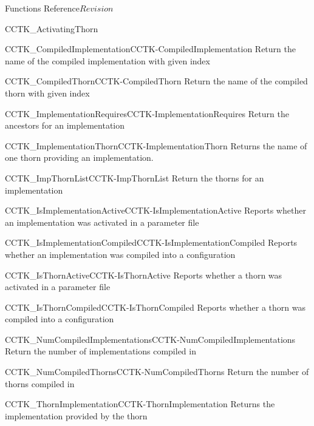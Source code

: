 \begin{cactuspart}{ Functions Reference}{}{$Revision$}
\begin{FunctionDescription}{CCTK\_ActivatingThorn}
\begin{SeeAlsoSection}
\begin{SeeAlso2}{CCTK\_CompiledImplementation}{CCTK-CompiledImplementation}
  Return the name of the compiled implementation with given index
\end{SeeAlso2}
\begin{SeeAlso2}{CCTK\_CompiledThorn}{CCTK-CompiledThorn}
  Return the name of the compiled thorn with given index
\end{SeeAlso2}
\begin{SeeAlso2}{CCTK\_ImplementationRequires}{CCTK-ImplementationRequires}
  Return the ancestors for an implementation
\end{SeeAlso2}
\begin{SeeAlso2}{CCTK\_ImplementationThorn}{CCTK-ImplementationThorn}
  Returns the name of one thorn providing an implementation.
\end{SeeAlso2}
\begin{SeeAlso2}{CCTK\_ImpThornList}{CCTK-ImpThornList}
  Return the thorns for an implementation
\end{SeeAlso2}
\begin{SeeAlso2}{CCTK\_IsImplementationActive}{CCTK-IsImplementationActive}
  Reports whether an implementation was activated in a parameter file
\end{SeeAlso2}
\begin{SeeAlso2}{CCTK\_IsImplementationCompiled}{CCTK-IsImplementationCompiled}
  Reports whether an implementation was compiled into a configuration
\end{SeeAlso2}
\begin{SeeAlso2}{CCTK\_IsThornActive}{CCTK-IsThornActive}
  Reports whether a thorn was activated in a parameter file
\end{SeeAlso2}
\begin{SeeAlso2}{CCTK\_IsThornCompiled}{CCTK-IsThornCompiled}
  Reports whether a thorn was compiled into a configuration
\end{SeeAlso2}
\begin{SeeAlso2}{CCTK\_NumCompiledImplementations}{CCTK-NumCompiledImplementations}
  Return the number of implementations compiled in
\end{SeeAlso2}
\begin{SeeAlso2}{CCTK\_NumCompiledThorns}{CCTK-NumCompiledThorns}
  Return the number of thorns compiled in
\end{SeeAlso2}
\begin{SeeAlso2}{CCTK\_ThornImplementation}{CCTK-ThornImplementation}
  Returns the implementation provided by the thorn
\end{SeeAlso2}
\end{SeeAlsoSection}


\end{FunctionDescription}
\end{cactuspart}
